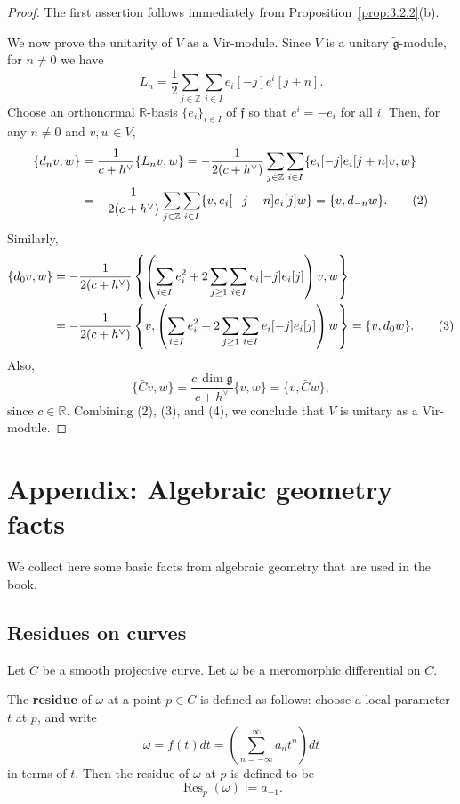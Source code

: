 \documentclass[12pt]{article}
\begin{document}
\begin{proof}
The first assertion follows immediately from Proposition~\ref{prop:3.2.2}(b).

We now prove the unitarity of $V$ as a Vir-module.
Since $V$ is a unitary $\widetilde{\mathfrak{g}}$-module, for $n\ne0$ we have
\[
L_n=\frac{1}{2}\sum_{j\in\mathbb{Z}}\sum_{i\in I} e_i[-j]e^i[j+n].
\]
Choose an orthonormal $\mathbb{R}$-basis $\{e_i\}_{i\in I}$ of $\mathfrak{f}$ so that $e^i=-e_i$ for all $i$.  
Then, for any $n\ne0$ and $v,w\in V$,
\begin{align}
\{d_n v,w\}
&=\frac{1}{c+h^{\vee}}\{L_n v,w\}
=-\frac{1}{2(c+h^{\vee})}\sum_{j\in\mathbb{Z}}\sum_{i\in I}
\{e_i[-j]e_i[j+n]v,w\}\notag\\
&=-\frac{1}{2(c+h^{\vee})}\sum_{j\in\mathbb{Z}}\sum_{i\in I}
\{v,e_i[-j-n]e_i[j]w\}
=\{v,d_{-n}w\}.
\tag{2}
\end{align}
Similarly,
\begin{align}
\{d_0v,w\}
&=-\frac{1}{2(c+h^{\vee})}
\left\{\left(\sum_{i\in I} e_i^2 + 2\sum_{j\ge1}\sum_{i\in I} e_i[-j]e_i[j]\right)v,w\right\}\notag\\
&=-\frac{1}{2(c+h^{\vee})}
\left\{v,\left(\sum_{i\in I} e_i^2 + 2\sum_{j\ge1}\sum_{i\in I} e_i[-j]e_i[j]\right)w\right\}
=\{v,d_0w\}.
\tag{3}
\end{align}
Also,
\begin{equation}
\{\bar{C}v,w\}
=\frac{c\,\dim\mathfrak{g}}{c+h^{\vee}}\{v,w\}
=\{v,\bar{C}w\},
\tag{4}
\end{equation}
since $c\in\mathbb{R}$.  
Combining (2), (3), and (4), we conclude that $V$ is unitary as a Vir-module.
\end{proof}


\section{Appendix: Algebraic geometry facts}
We collect here some basic facts from algebraic geometry that are used in the book.
\subsection{Residues on curves}
Let $C$ be a smooth projective curve. Let $\omega$ be a meromorphic differential on $C$.
\begin{definition}
    [Residue] The \textbf{residue} of $\omega$ at a point $p \in C$ is defined as follows: choose a local parameter $t$ at $p$, and write
    \[\omega = f(t) dt = \left(\sum_{n=-\infty}^{\infty} a_n t^n\right) dt\] in terms of $t$. Then the residue of $\omega$ at $p$ is defined to be
    \[\operatorname{Res}_p(\omega) := a_{-1}.\]
\end{definition}
\end{document}
